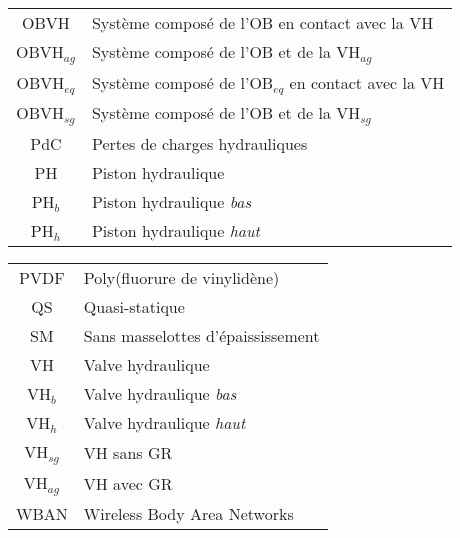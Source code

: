 \begin{table}
\begin{tabular}{c l}
OBVH        & Système composé de l’OB en contact avec la VH        \\
OBVH$_{ag}$ & Système composé de l'OB et de la VH$_{ag}$                     \\   
OBVH$_{eq}$ & Système composé de l’OB$_{eq}$ en contact avec la VH \\
OBVH$_{sg}$ & Système composé de l'OB et de la VH$_{sg}$                     \\  \cline{1-1}
PdC         & Pertes de charges hydrauliques                                 \\
PH          & Piston hydraulique                                             \\
PH$_b$      & Piston hydraulique \emph{bas}                                  \\
PH$_h$      & Piston hydraulique \emph{haut}                                 \\
      \end{tabular}
\end{table}

\begin{table}
      \begin{tabular}{c l}
PVDF        & Poly(fluorure de vinylidène)                              \\  \cline{1-1}
QS          & Quasi-statique                     \\  \cline{1-1}
SM          & Sans masselottes d'épaississement \\  \cline{1-1}
VH          & Valve hydraulique                                              \\
VH$_b$      & Valve hydraulique \emph{bas}                                   \\
VH$_h$      & Valve hydraulique \emph{haut}                                  \\
VH$_{sg}$   & VH sans GR                                                     \\
VH$_{ag}$   & VH avec GR                                                     \\  \cline{1-1}
WBAN        & Wireless Body Area Networks  \\
\bottomrule
     \end{tabular}
\end{table}